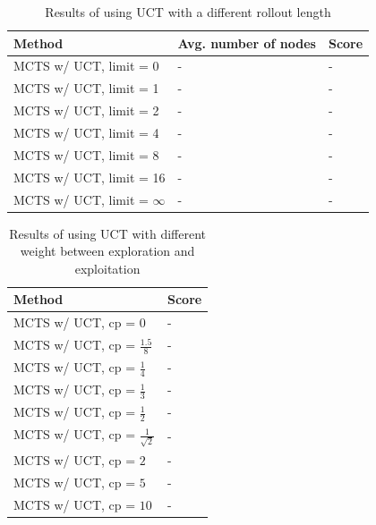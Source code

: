 \documentclass[10pt,a4paper]{article}
\begin{document}
\begin{table}[h]
	\centering
	\begin{tabular}{| l | l | l |}
		\hline
		\textbf{Method} & \textbf{Avg. number of nodes} & \textbf{Score} \\ \hline
		MCTS w/ UCT, limit = 0			& - & - \\ \hline
		MCTS w/ UCT, limit = 1			& - & - \\ \hline
		MCTS w/ UCT, limit = 2			& - & - \\ \hline
		MCTS w/ UCT, limit = 4			& - & - \\ \hline
		MCTS w/ UCT, limit = 8			& - & - \\ \hline
		MCTS w/ UCT, limit = 16			& - & - \\ \hline
		MCTS w/ UCT, limit = $\infty$	& - & - \\ \hline
	\end{tabular}
	\caption{Results of using UCT with a different rollout length}
	\label{tab:uct_results}
\end{table}

\begin{table}[h]
	\centering
	\begin{tabular}{| l | l |}
		\hline
		\textbf{Method} & \textbf{Score} \\ \hline
		MCTS w/ UCT, cp = 0			 			& - \\ \hline
		MCTS w/ UCT, cp = $\frac{1.5}{8}$		& - \\ \hline
		MCTS w/ UCT, cp = $\frac{1}{4}$		 	& - \\ \hline
		MCTS w/ UCT, cp = $\frac{1}{3}$		 	& - \\ \hline
		MCTS w/ UCT, cp = $\frac{1}{2}$		 	& - \\ \hline
		MCTS w/ UCT, cp = $\frac{1}{\sqrt{2}}$	& - \\ \hline
		MCTS w/ UCT, cp = $2$			 		& - \\ \hline
		MCTS w/ UCT, cp = $5$			 		& - \\ \hline
		MCTS w/ UCT, cp = $10$		 			& - \\ \hline
	\end{tabular}
	\caption{Results of using UCT with different weight between exploration and exploitation}
	\label{tab:uct_cp_results}
\end{table}
\end{document}
